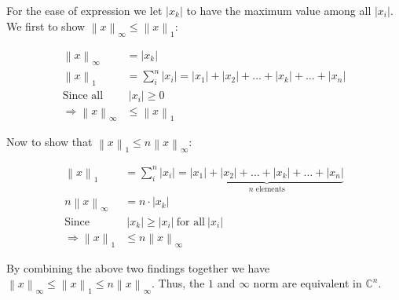 \documentclass[11pt]{article}
\providecommand{\norm}[1]{\left\lVert #1 \right\rVert}
\providecommand{\len}[1]{\left| #1 \right|}
\begin{document}
For the ease of expression we let $\len{x_k}$ to have the maximum value among all $\len{x_i}$. We first to show $\norm{x}_{\infty} \leq \norm{x}_1$:

\begin{align*}
    \norm{x}_{\infty} &= \len{x_k} \\
    \norm{x}_1 &= \sum_i^n \len{x_i} = \len{x_1} + \len{x_2} + \dots + \len{x_k} + \dots + \len{x_n} \\
    \text{Since all} &\ \len{x_i} \geq 0 \\
    \Longrightarrow \norm{x}_{\infty} &\leq \norm{x}_1
\end{align*}

Now to show that $\norm{x}_1 \leq n\norm{x}_{\infty}$:

\begin{align*}
    \norm{x}_1 &= \sum_i^n \len{x_i} = \underbrace{\len{x_1} + \len{x_2} + \dots + \len{x_k} + \dots + \len{x_n}}_{\text{$n$ elements}} \\
    n\norm{x}_{\infty} &= n \cdot \len{x_k} \\
    \text{Since} &\ \len{x_k} \geq \len{x_i} \ \text{for all} \ \len{x_i}\\
    \Longrightarrow \norm{x}_1 &\leq n\norm{x}_{\infty}
\end{align*}

By combining the above two findings together we have $\norm{x}_{\infty} \leq \norm{x}_1  \leq n\norm{x}_{\infty}$. Thus, the $1$ and $\infty$ norm are equivalent in $\mathbb{C}^n$.
\end{document}
